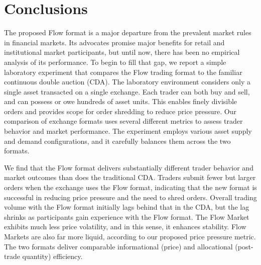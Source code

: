 \documentclass[12pt]{article}
\begin{document}
\section{Conclusions} 
\label{conclusion}

The proposed Flow format is a major departure from the prevalent market rules in financial markets. 
Its advocates promise major benefits for retail and institutional market participants, but until now, there has been no empirical analysis of its performance. 
To begin to fill that gap, we report a simple laboratory experiment that compares the Flow trading format to the familiar continuous double auction (CDA). 
The laboratory environment considers only a single asset transacted on a single exchange. 
Each trader can both buy and sell, and can possess or owe hundreds of asset units. This enables finely divisible orders and
provides scope for order shredding to reduce price pressure. 
Our comparison of exchange formats uses several different metrics to assess trader behavior and market performance.
The experiment employs various asset supply and demand configurations, and it carefully balances them across the two formats.




We find that the Flow format delivers substantially different trader behavior and market outcomes than does the traditional CDA.  
Traders submit fewer but larger orders when the exchange uses the Flow format, indicating that the new format is successful in reducing price pressure and the need to shred orders.
Overall trading volume with the Flow format initially lags behind that in the CDA, but the lag shrinks as participants gain experience with the Flow format. 
The Flow Market exhibits much less price volatility, and in this sense, it enhances stability. 
Flow Markets are also far more liquid, according to our proposed price pressure metric.
The two formats deliver comparable
informational (price) and allocational (post-trade quantity)  efficiency. 
\end{document}
